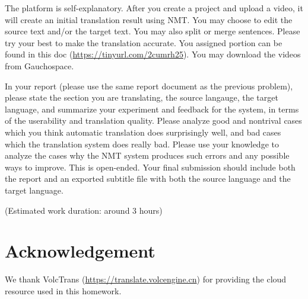 \documentclass[12pt,letterpaper]{article}
\begin{document}
The platform is self-explanatory. After you create a project and upload a video, it will create an initial translation result using NMT. You may choose to edit the source text and/or the target text. You may also split or merge sentences. 
Please try your best to make the translation accurate. You assigned portion can be found in this doc (\url{https://tinyurl.com/2cumrh25}). You may download the videos from Gauchospace. 

In your report (please use the same report document as the previous problem), please state the section you are translating, the source langauge, the target language, and summarize your experiment and feedback for the system, in terms of the userability and translation quality. Please analyze good and nontrival cases which you think automatic translation does surprisingly well, and bad cases which the translation system does really bad. 
Please use your knowledge to analyze the cases why the NMT system produces such errors and any possible ways to improve. This is open-ended. 
Your final submission should include both the report and an exported subtitle file with both the source language and the target language. 

(Estimated work duration: around 3 hours)

\section*{Acknowledgement}
We thank VolcTrans (\url{https://translate.volcengine.cn}) for providing the cloud resource used in this homework. 
\end{document}
